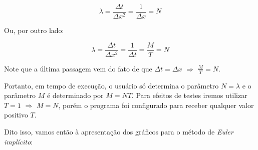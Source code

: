 \documentclass[a4paper, 12pt]{article}
\begin{document}
$$
\lambda = \frac{\Delta t}{\Delta x^2} = \frac{1}{\Delta x} = N
$$

Ou, por outro lado:

$$
\lambda = \frac{\Delta t}{\Delta x^2} = \frac{1}{\Delta t} = \frac{M}{T} = N
$$

Note que a última passagem vem do fato de que $\Delta t = \Delta x$ $\Rightarrow$ $\frac{M}{T} = N$.

Portanto, em tempo de execução, o usuário só determina o parâmetro $N=\lambda$ e o parâmetro $M$ é determinado por $M=NT$. Para efeitos de testes iremos utilizar $T=1$ $\Rightarrow$ $M=N$, porém o programa foi configurado para receber qualquer valor positivo $T$.

Dito isso, vamos então à apresentação dos gráficos para o método de \textit{Euler implícito}:
\end{document}
